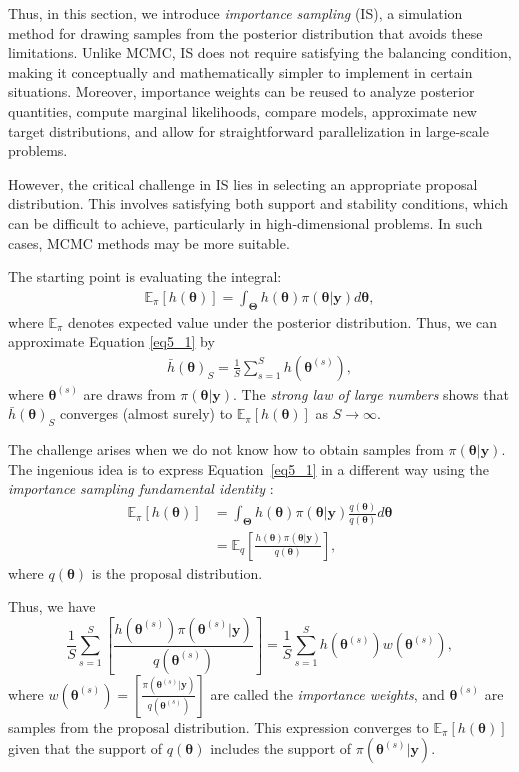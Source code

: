 Thus, in this section, we introduce \textit{importance sampling} (IS), a simulation method for drawing samples from the posterior distribution that avoids these limitations. Unlike MCMC, IS does not require satisfying the balancing condition, making it conceptually and mathematically simpler to implement in certain situations. Moreover, importance weights can be reused to analyze posterior quantities, compute marginal likelihoods, compare models, approximate new target distributions, and allow for straightforward parallelization in large-scale problems.

However, the critical challenge in IS lies in selecting an appropriate proposal distribution. This involves satisfying both support and stability conditions, which can be difficult to achieve, particularly in high-dimensional problems. In such cases, MCMC methods may be more suitable.

The starting point is evaluating the integral:
\begin{align}\label{eq5_1}
	\mathbb{E}_{\pi}[h(\bm{\theta})]=\int_{\bm{\Theta}} h(\bm{\theta}) \pi(\bm{\theta}|\bm{y})d\bm{\theta},
\end{align}
where $\mathbb{E}_{\pi}$ denotes expected value under the posterior distribution.
Thus, we can approximate Equation \ref{eq5_1} by
\begin{align}\label{eq5_2}
	\bar{h}(\bm{\theta})_S=\frac{1}{S}\sum_{s=1}^S h(\bm{\theta}^{(s)}), 
\end{align}
where $\bm{\theta}^{(s)}$ are draws from $\pi(\bm{\theta}|\bm{y})$. The \textit{strong law of large numbers} shows that $\bar{h}(\bm{\theta})_S$ converges (almost surely) to $\mathbb{E}_{\pi}[h(\bm{\theta})]$ as $S \rightarrow \infty$.

The challenge arises when we do not know how to obtain samples from $\pi(\bm{\theta}|\bm{y})$. The ingenious idea is to express Equation~\ref{eq5_1} in a different way using the \textit{importance sampling fundamental identity} \cite[Chap.~3]{robert2011monte}:
\begin{align}\label{eq5_3}
	\mathbb{E}_{\pi}[h(\bm{\theta})]&=\int_{\bm{\Theta}} h(\bm{\theta}) \pi(\bm{\theta}|\bm{y})\frac{q(\bm{\theta})}{q(\bm{\theta})}d\bm{\theta}\nonumber\\
	&=\mathbb{E}_{q}\left[\frac{h(\bm{\theta})\pi(\bm{\theta}|\bm{y})}{q(\bm{\theta})}\right],
\end{align}   
where $q(\bm{\theta})$ is the proposal distribution.

Thus, we have $$\frac{1}{S}\sum_{s=1}^S \left[\frac{h(\bm{\theta}^{(s)})\pi(\bm{\theta}^{(s)}|\bm{y})}{q(\bm{\theta}^{(s)})}\right]= \frac{1}{S}\sum_{s=1}^S h(\bm{\theta}^{(s)})w(\bm{\theta}^{(s)}),$$ where $w(\bm{\theta}^{(s)})= \left[\frac{\pi(\bm{\theta}^{(s)}|\bm{y})}{q(\bm{\theta}^{(s)})}\right]$ are called the \textit{importance weights}, and $\bm{\theta}^{(s)}$ are samples from the proposal distribution. This expression converges to $\mathbb{E}_{\pi}[h(\bm{\theta})]$ given that the support of $q(\bm{\theta})$ includes the support of $\pi(\bm{\theta}^{(s)}|\bm{y})$.

